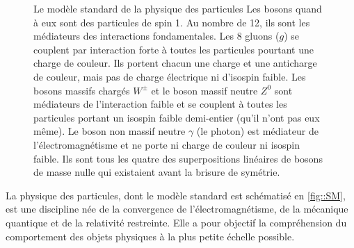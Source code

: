 \begin{figure}[htpb!]
\begin{activitybox}[label=box::SM]{Le modèle standard de la physique des particules}
			    	Les bosons quand à eux sont des particules de spin 1. Au nombre de 12, ils sont les médiateurs des interactions fondamentales. Les 8 gluons ($g$) se couplent par interaction forte à toutes les particules pourtant une charge de couleur. Ils portent chacun une charge et une anticharge de couleur, mais pas de charge électrique ni d'isospin faible. Les bosons massifs chargés $W^{\pm}$ et le boson massif neutre $Z^0$ sont médiateurs de l'interaction faible et se couplent à toutes les particules portant un isospin faible demi-entier (qu'il n'ont pas eux même). Le boson non massif neutre $\gamma$ (le photon) est médiateur de l'électromagnétisme et ne porte ni charge de couleur ni isospin faible. Ils sont tous les quatre des superpositions linéaires de bosons de masse nulle qui existaient avant la brisure de symétrie.
				\end{activitybox}
			\end{figure}
	    
		    La physique des particules, dont le modèle standard est schématisé en \autoref{fig::SM}, est une discipline née de la convergence de l'électromagnétisme, de la mécanique quantique et de la relativité restreinte. Elle a pour objectif la compréhension du comportement des objets physiques à la plus petite échelle possible.
		    
